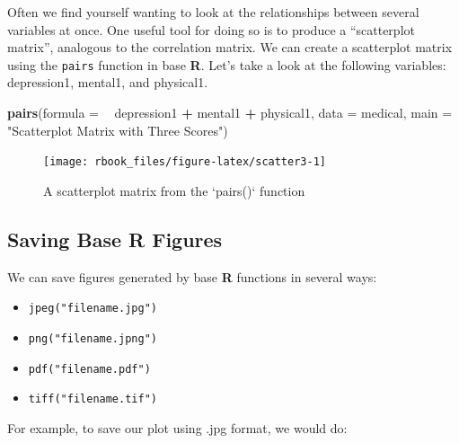 \documentclass[]{book}
\newenvironment{Shaded}{\begin{snugshade}}{\end{snugshade}}
\newcommand{\DataTypeTok}[1]{\textcolor[rgb]{0.13,0.29,0.53}{#1}}
\newcommand{\DecValTok}[1]{\textcolor[rgb]{0.00,0.00,0.81}{#1}}
\newcommand{\KeywordTok}[1]{\textcolor[rgb]{0.13,0.29,0.53}{\textbf{#1}}}
\newcommand{\NormalTok}[1]{#1}
\newcommand{\OperatorTok}[1]{\textcolor[rgb]{0.81,0.36,0.00}{\textbf{#1}}}
\newcommand{\StringTok}[1]{\textcolor[rgb]{0.31,0.60,0.02}{#1}}
\providecommand{\tightlist}{%
  \setlength{\itemsep}{0pt}\setlength{\parskip}{0pt}}
\begin{document}
Often we find yourself wanting to look at the relationships between several variables at once. One useful tool for doing so is to produce a ``scatterplot matrix'', analogous to the correlation matrix. We can create a scatterplot matrix using the \texttt{pairs} function in base \textbf{R}. Let's take a look at the following variables: depression1, mental1, and physical1.

\begin{Shaded}
\begin{Highlighting}[]
\KeywordTok{pairs}\NormalTok{(}\DataTypeTok{formula =} \OperatorTok{~}\StringTok{ }\NormalTok{depression1 }\OperatorTok{+}\StringTok{ }\NormalTok{mental1 }\OperatorTok{+}\StringTok{ }\NormalTok{physical1,}
      \DataTypeTok{data =}\NormalTok{ medical,}
      \DataTypeTok{main =} \StringTok{"Scatterplot Matrix with Three Scores"}\NormalTok{)}
\end{Highlighting}
\end{Shaded}

\begin{figure}

{\centering \texttt{[image: rbook\_files/figure-latex/scatter3-1]} 

}

\caption{A scatterplot matrix from the `pairs()` function}\label{fig:scatter3}
\end{figure}

\hypertarget{saving-base-r-figures}{%
\subsection{\texorpdfstring{Saving Base \textbf{R} Figures}{Saving Base R Figures}}\label{saving-base-r-figures}}

We can save figures generated by base \textbf{R} functions in several ways:

\begin{itemize}
\tightlist
\item
  \texttt{jpeg("filename.jpg")}
\item
  \texttt{png("filename.jpng")}
\item
  \texttt{pdf("filename.pdf")}
\item
  \texttt{tiff("filename.tif")}
\end{itemize}

For example, to save our plot using .jpg format, we would do:

\begin{Shaded}
\end{Shaded}
\end{document}
